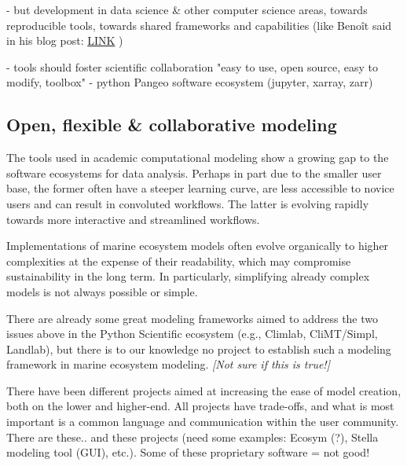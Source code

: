 \documentclass[journal abbreviation, manuscript]{copernicus}
\begin{document}
- but development in data science \& other computer science areas, towards reproducible tools, towards shared frameworks and capabilities (like Benoît said in his blog post: \href{https://medium.com/pangeo/pangeo-data-and-models-280b251ff0cd}{LINK} )

- tools should foster scientific collaboration
"easy to use, open source, easy to modify, toolbox"
- python Pangeo software ecosystem (jupyter, xarray, zarr)


\subsection{Open, flexible \& collaborative modeling}



The tools used in academic computational modeling show a growing gap to the software ecosystems for data analysis. Perhaps in part due to the smaller user base, the former often have a steeper learning curve, are less accessible to novice users and can result in convoluted workflows. The latter is evolving rapidly towards more interactive and streamlined workflows.

Implementations of marine ecosystem models often evolve organically to higher complexities at the expense of their readability, which may compromise sustainability in the long term. In particularly, simplifying already complex models is not always possible or simple.

There are already some great modeling frameworks aimed to address the two issues above in the Python Scientific ecosystem (e.g., Climlab, CliMT/Simpl, Landlab), but there is to our knowledge no project to establish such a modeling framework in marine ecosystem modeling. \textit{[Not sure if this is true!]}

There have been different projects aimed at increasing the ease of model creation, both on the lower and higher-end. All projects have trade-offs, and what is most important is a common language and communication within the user community.
There are these.. and these projects (need some examples: Ecosym (?), Stella modeling tool (GUI), etc.).
Some of these proprietary software = not good!
\end{document}
